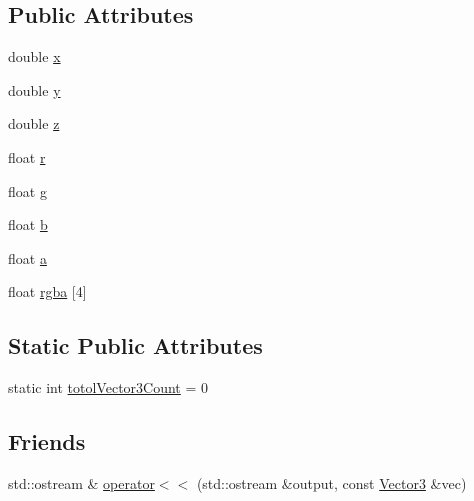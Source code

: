 \subsection*{Public Attributes}
\begin{DoxyCompactItemize}
\item 
double \hyperlink{class_vector3_a60aa84ebc037dec9faba617f8ddb231d}{x}
\item 
double \hyperlink{class_vector3_ae4965693beffdb6069e0618222cae459}{y}
\item 
double \hyperlink{class_vector3_aa5f4108b2839a110eeaec8606780eaff}{z}
\item 
float \hyperlink{class_vector3_a83d49327a46971813ef59a9d96f99d1a}{r}
\item 
float \hyperlink{class_vector3_a8a37d2d94360d873e5eae2afcebddfdd}{g}
\item 
float \hyperlink{class_vector3_acef6bb205980d2e29d3d781805b84344}{b}
\item 
float \hyperlink{class_vector3_a109d6f958e8b10613c83af9f6d5e196b}{a}
\item 
float \hyperlink{class_vector3_a37a489d4fcc8044f95ae8520fb0974d4}{rgba} \mbox{[}4\mbox{]}
\end{DoxyCompactItemize}
\subsection*{Static Public Attributes}
\begin{DoxyCompactItemize}
\item 
static int \hyperlink{class_vector3_a3142c9bdfeaa6eff51cbd02bf583603b}{totol\-Vector3\-Count} = 0
\end{DoxyCompactItemize}
\subsection*{Friends}
\begin{DoxyCompactItemize}
\item 
std\-::ostream \& \hyperlink{class_vector3_a450dd24aa70715d0db6a773973bae2df}{operator$<$$<$} (std\-::ostream \&output, const \hyperlink{class_vector3}{Vector3} \&vec)
\end{DoxyCompactItemize}
